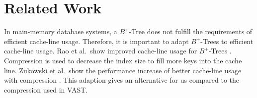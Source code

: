\documentclass[runningheads,a4paper]{llncs}
\begin{document}




\section{Related Work}
In main-memory database systems, a $B^+$-Tree does not fulfill the requirements of efficient cache-line usage. Therefore, it is important to adapt $B^+$-Trees to efficient cache-line usage. Rao et al.\ show improved cache-line usage for $B^+$-Trees \cite{rao1999cache}. Compression is used to decrease the index size to fill more keys into the cache line. Zukowski et al.\ show the performance increase of better cache-line usage with compression \cite{zukowski2006super}. This adaption gives an alternative for us compared to the compression used in VAST. 
\end{document}

